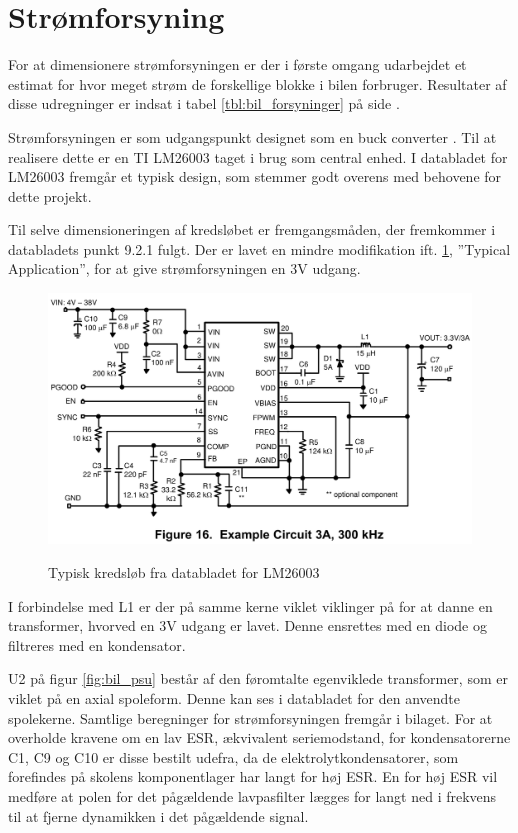 \section{Strømforsyning} %

For at dimensionere strømforsyningen er der i første omgang udarbejdet et estimat for hvor meget strøm de forskellige blokke i bilen forbruger.
Resultater af disse udregninger er indsat i tabel \ref{tbl:bil_forsyninger} på side \pageref{tbl:bil_forsyninger}.

Strømforsyningen er som udgangspunkt designet som en buck converter \cite[afsnit 6.10]{lib:analogteknik}.
Til at realisere dette er en TI LM26003 taget i brug som central enhed.
I databladet for LM26003\cite{lib:lm26003} fremgår et typisk design, som stemmer godt overens med behovene for dette projekt.

Til selve dimensioneringen af kredsløbet er fremgangsmåden, der fremkommer i databladets punkt 9.2.1 fulgt. 
Der er lavet en mindre modifikation ift. \ref{fig:lm26003fig16}, ''Typical Application'', for at give strømforsyningen en 3V udgang.

\begin{figure}[h]
\centering
\includegraphics[width=\textwidth* 9/10]{../fig/billeder/lm26003fig16}
\label{fig:lm26003fig16}
\caption{Typisk kredsløb fra databladet for LM26003}
\end{figure}

I forbindelse med L1 er der på samme kerne viklet viklinger på for at danne en transformer, hvorved en 3V udgang er lavet. 
Denne ensrettes med en diode og filtreres med en kondensator. 

U2 på figur \ref{fig:bil_psu} består af den føromtalte egenviklede transformer, som er viklet på en axial spoleform. 
Denne kan ses i databladet for den anvendte spolekerne\cite{lib:psu_L1core}. 
Samtlige beregninger for strømforsyningen fremgår i bilaget\cite{lib:psu_calcs}.
For at overholde kravene om en lav ESR, ækvivalent seriemodstand, for kondensatorerne C1, C9 og C10 er disse bestilt udefra, da de elektrolytkondensatorer, som forefindes på skolens komponentlager har langt for høj ESR. 
En for høj ESR vil medføre at polen for det pågældende lavpasfilter lægges for langt ned i frekvens til at fjerne dynamikken i det pågældende signal.

